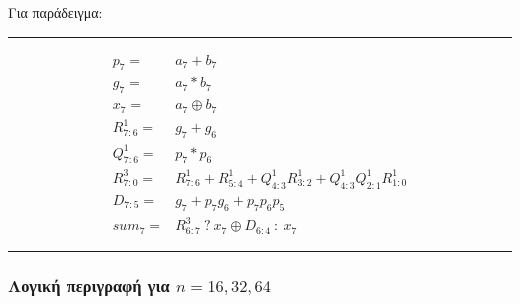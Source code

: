Για παράδειγμα:\\
\rule{\linewidth}{0.5mm}
\begin{equation*}
\begin{split}
p_7 =& a_7 + b_7\\
g_7 =& a_7 * b_7\\
x_7 =& a_7 \oplus b_7 \\
R^1_{7:6} =& g_7 + g_{6}\\
Q^1_{7:6} =& p_7 * p_{6}\\
R^3_{7:0} =& R^1_{7:6} + R^1_{5:4} + Q^1_{4:3} R^1_{3:2} + Q^1_{4:3} Q^1_{2:1} R^1_{1:0}\\
D_{7:5} =& g_7 + p_7g_{6} + p_7p_{6}p_{5}\\
sum_7 =& R^3_{6:7}\ ?\ x_7 \oplus D_{6:4}\ :\ x_7 
\end{split}
\end{equation*}
\rule{\linewidth}{0.5mm}











\subsubsection{Λογική περιγραφή για $n={16, 32, 64}$}











